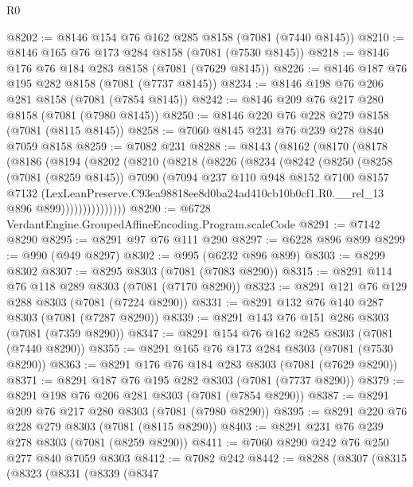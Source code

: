\begin{lexlean}{R0}
\begin{coremodule}
@8202 := @8146 @154 @76 @162 @285 @8158 (@7081 (@7440 @8145))
@8210 := @8146 @165 @76 @173 @284 @8158 (@7081 (@7530 @8145))
@8218 := @8146 @176 @76 @184 @283 @8158 (@7081 (@7629 @8145))
@8226 := @8146 @187 @76 @195 @282 @8158 (@7081 (@7737 @8145))
@8234 := @8146 @198 @76 @206 @281 @8158 (@7081 (@7854 @8145))
@8242 := @8146 @209 @76 @217 @280 @8158 (@7081 (@7980 @8145))
@8250 := @8146 @220 @76 @228 @279 @8158 (@7081 (@8115 @8145))
@8258 := @7060 @8145 @231 @76 @239 @278 @840 @7059 @8158
@8259 := @7082 @231
@8288 := @8143
    (@8162
      (@8170
        (@8178
          (@8186
            (@8194
              (@8202
                (@8210
                  (@8218
                    (@8226
                      (@8234
                        (@8242
                          (@8250
                            (@8258
                              (@7081 (@8259 @8145))
                              @7090
                              (@7094
                                @237
                                @110
                                @948
                                @8152
                                @7100
                                @8157
                                @7132
                                (LexLeanPreserve.C93ea98818ee8d0ba24ad410cb10b0cf1.R0.__rel_13
                                  @896
                                  @899)))))))))))))))
@8290 := @6728 VerdantEngine.GroupedAffineEncoding.Program.scaleCode
@8291 := @7142 @8290
@8295 := @8291 @97 @76 @111 @290
@8297 := @6228 @896 @899
@8299 := @990 (@949 @8297)
@8302 := @995 (@6232 @896 @899)
@8303 := @8299 @8302
@8307 := @8295 @8303 (@7081 (@7083 @8290))
@8315 := @8291 @114 @76 @118 @289 @8303 (@7081 (@7170 @8290))
@8323 := @8291 @121 @76 @129 @288 @8303 (@7081 (@7224 @8290))
@8331 := @8291 @132 @76 @140 @287 @8303 (@7081 (@7287 @8290))
@8339 := @8291 @143 @76 @151 @286 @8303 (@7081 (@7359 @8290))
@8347 := @8291 @154 @76 @162 @285 @8303 (@7081 (@7440 @8290))
@8355 := @8291 @165 @76 @173 @284 @8303 (@7081 (@7530 @8290))
@8363 := @8291 @176 @76 @184 @283 @8303 (@7081 (@7629 @8290))
@8371 := @8291 @187 @76 @195 @282 @8303 (@7081 (@7737 @8290))
@8379 := @8291 @198 @76 @206 @281 @8303 (@7081 (@7854 @8290))
@8387 := @8291 @209 @76 @217 @280 @8303 (@7081 (@7980 @8290))
@8395 := @8291 @220 @76 @228 @279 @8303 (@7081 (@8115 @8290))
@8403 := @8291 @231 @76 @239 @278 @8303 (@7081 (@8259 @8290))
@8411 := @7060 @8290 @242 @76 @250 @277 @840 @7059 @8303
@8412 := @7082 @242
@8442 := @8288
    (@8307
      (@8315
        (@8323
          (@8331
            (@8339
              (@8347

\end{coremodule}
\end{lexlean}
